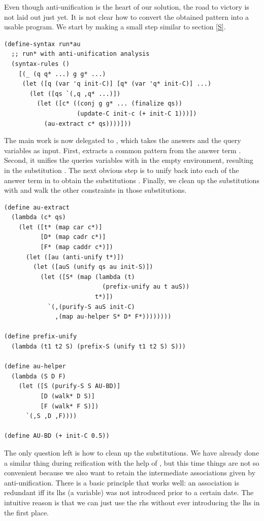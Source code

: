 Even though anti-unification is the heart of our solution, the road to victory is not laid out just yet. It is not clear how to convert the obtained pattern into a usable program. We start by making a small step similar to section \ref{S}.
\begin{lstlisting}
(define-syntax run*au
  ;; run* with anti-unification analysis
  (syntax-rules ()
    [(_ (q q* ...) g g* ...)
     (let ([q (var 'q init-C)] [q* (var 'q* init-C)] ...)
       (let ([qs `(,q ,q* ...)])
         (let ([c* ((conj g g* ... (finalize qs))
                    (update-C init-c (+ init-C 1)))])
           (au-extract c* qs))))]))
\end{lstlisting}

The main work is now delegated to , which takes the answers and the query variables as input. First,  extracts a common pattern  from the answer term . Second, it unifies the queries variables with  in the empty environment, resulting in the substitution . The next obvious step is to unify  back into each of the answer term in  to obtain the substitutions . Finally, we clean up the substitutions with  and walk the other constraints in those substitutions.
\begin{lstlisting}
(define au-extract
  (lambda (c* qs)
    (let ([t* (map car c*)]
          [D* (map cadr c*)]
          [F* (map caddr c*)])
      (let ([au (anti-unify t*)])
        (let ([auS (unify qs au init-S)])
          (let ([S* (map (lambda (t)
                           (prefix-unify au t auS))
                         t*)])
            `(,(purify-S auS init-C)
              ,(map au-helper S* D* F*))))))))

(define prefix-unify
  (lambda (t1 t2 S) (prefix-S (unify t1 t2 S) S)))

(define au-helper
  (lambda (S D F)
    (let ([S (purify-S S AU-BD)]
          [D (walk* D S)]
          [F (walk* F S)])
      `(,S ,D ,F))))

(define AU-BD (+ init-C 0.5))
\end{lstlisting}

The only question left is how to clean up the substitutions. We have already done a similar thing during reification with the help of , but this time things are not so convenient because we also want to retain the intermediate associations given by anti-unification. There is a basic principle that works well: an association is redundant iff its lhs (a variable) was not introduced prior to a certain date. The intuitive reason is that we can just use the rhs without ever introducing the lhs in the first place.

